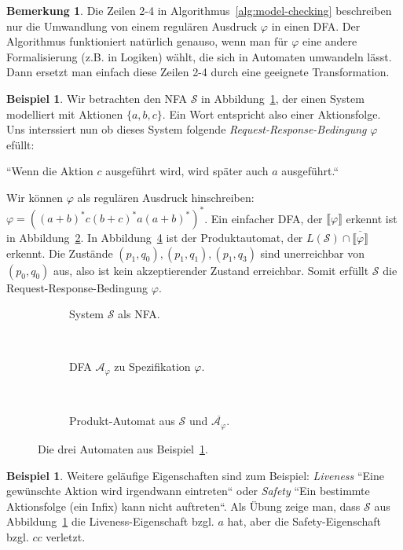 \documentclass[11pt, a4paper]{article}
\theoremstyle{definition}
\newtheorem{example}[definition]{Beispiel}
\newtheorem*{remark*}{Bemerkung}
\theoremstyle{plain}
\numberwithin{equation}{section}
\newcommand{\comp}[1]{\overline{#1}}
\begin{document}
\begin{remark*}
	Die Zeilen 2-4 in Algorithmus~\ref{alg:model-checking} beschreiben nur die Umwandlung von einem regulären Ausdruck $\varphi$ in einen DFA. Der Algorithmus funktioniert natürlich genauso, wenn man für $\varphi$ eine andere Formalisierung (z.B. in Logiken) wählt, die sich in Automaten umwandeln lässt. Dann ersetzt man einfach diese Zeilen 2-4 durch eine geeignete Transformation.
\end{remark*}
\begin{example}\label{exp:mc}
	Wir betrachten den NFA $\mathcal{S}$ in Abbildung~\ref{fig:mc_system}, der einen System modelliert mit Aktionen $\{a, b, c\}$. Ein Wort entspricht also einer Aktionsfolge. Uns interssiert nun ob dieses System folgende \textit{Request-Response-Bedingung} $\varphi$ efüllt: 
	\begin{center}
		``Wenn die Aktion $c$ ausgeführt wird, wird später auch $a$ ausgeführt.``
	\end{center}
	Wir können $\varphi$ als regulären Ausdruck hinschreiben: $\varphi = ((a+b)^\ast c (b+c)^\ast a (a+b)^\ast)^\ast$. Ein einfacher DFA, der $\llbracket \varphi \rrbracket$ erkennt ist in Abbildung~\ref{fig:mc_spec}. In Abbildung~\ref{fig:mc_prod} ist der Produktautomat, der $L(\mathcal{S}) \cap \comp{\llbracket \varphi \rrbracket}$ erkennt. Die Zustände $(p_1, q_0), (p_1, q_1), (p_1, q_3)$ sind unerreichbar von $(p_0, q_0)$ aus, also ist kein akzeptierender Zustand erreichbar. Somit erfüllt $\mathcal{S}$ die Request-Response-Bedingung $\varphi$.
\end{example}
\begin{figure}
	\centering
	\begin{subfigure}[b]{.49\textwidth}
		\centering
		
		\caption{System $\mathcal{S}$ als NFA.}
		\label{fig:mc_system}
	\end{subfigure}\\
	\begin{subfigure}[b]{.49\textwidth}
		\centering
		
		\caption{DFA $\mathcal{A}_\varphi$ zu Spezifikation $\varphi$.}
		\label{fig:mc_spec}
	\end{subfigure}\\
	\begin{subfigure}[b]{.9\textwidth}
		\centering
		
		\caption{Produkt-Automat aus $\mathcal{S}$ und $\comp{\mathcal{A}_\varphi}$.}
		\label{fig:mc_prod}
	\end{subfigure}
	\caption{Die drei Automaten aus Beispiel~\ref{exp:mc}.}
\end{figure}
\begin{example}
	Weitere geläufige Eigenschaften sind zum Beispiel: \textit{Liveness} ``Eine ge\-wünsch\-te Aktion wird irgendwann eintreten`` oder \textit{Safety} ``Ein bestimmte Aktionsfolge (ein Infix) kann nicht auftreten``. Als Übung zeige man, dass $\mathcal{S}$ aus Abbildung~\ref{fig:mc_system} die Liveness-Eigenschaft bzgl. $a$ hat, aber die Safety-Eigenschaft bzgl. $cc$ verletzt.
\end{example}
\end{document}

